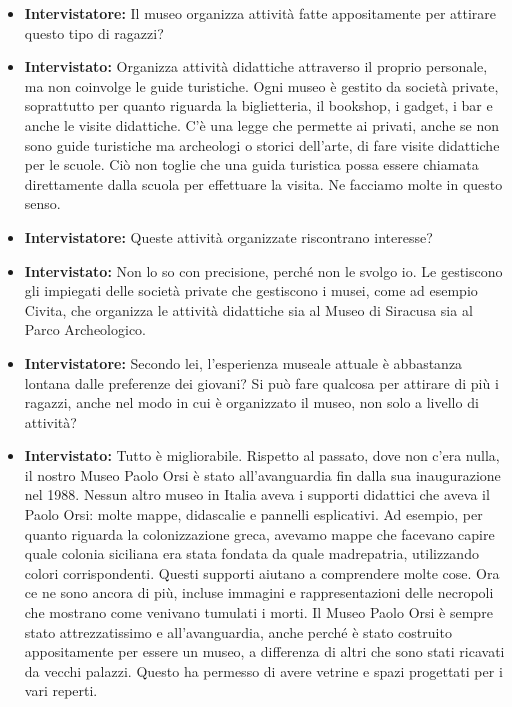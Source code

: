 \documentclass{article}
\begin{document}
\begin{itemize}
    \item \textbf{Intervistatore:} Il museo organizza attività fatte appositamente per attirare questo tipo di ragazzi?
    
    \item \textbf{Intervistato:} Organizza attività didattiche attraverso il proprio personale, ma non coinvolge le guide turistiche. Ogni museo è gestito da società private, soprattutto per quanto riguarda la biglietteria, il bookshop, i gadget, i bar e anche le visite didattiche. C’è una legge che permette ai privati, anche se non sono guide turistiche ma archeologi o storici dell’arte, di fare visite didattiche per le scuole. Ciò non toglie che una guida turistica possa essere chiamata direttamente dalla scuola per effettuare la visita. Ne facciamo molte in questo senso.
    
    \item \textbf{Intervistatore:} Queste attività organizzate riscontrano interesse?
    
    \item \textbf{Intervistato:} Non lo so con precisione, perché non le svolgo io. Le gestiscono gli impiegati delle società private che gestiscono i musei, come ad esempio Civita, che organizza le attività didattiche sia al Museo di Siracusa sia al Parco Archeologico.
    
    \item \textbf{Intervistatore:} Secondo lei, l’esperienza museale attuale è abbastanza lontana dalle preferenze dei giovani? Si può fare qualcosa per attirare di più i ragazzi, anche nel modo in cui è organizzato il museo, non solo a livello di attività?
    
    \item \textbf{Intervistato:} Tutto è migliorabile. Rispetto al passato, dove non c’era nulla, il nostro Museo Paolo Orsi è stato all’avanguardia fin dalla sua inaugurazione nel 1988. Nessun altro museo in Italia aveva i supporti didattici che aveva il Paolo Orsi: molte mappe, didascalie e pannelli esplicativi. Ad esempio, per quanto riguarda la colonizzazione greca, avevamo mappe che facevano capire quale colonia siciliana era stata fondata da quale madrepatria, utilizzando colori corrispondenti. Questi supporti aiutano a comprendere molte cose. Ora ce ne sono ancora di più, incluse immagini e rappresentazioni delle necropoli che mostrano come venivano tumulati i morti. Il Museo Paolo Orsi è sempre stato attrezzatissimo e all’avanguardia, anche perché è stato costruito appositamente per essere un museo, a differenza di altri che sono stati ricavati da vecchi palazzi. Questo ha permesso di avere vetrine e spazi progettati per i vari reperti.
    

\end{itemize}
\end{document}
